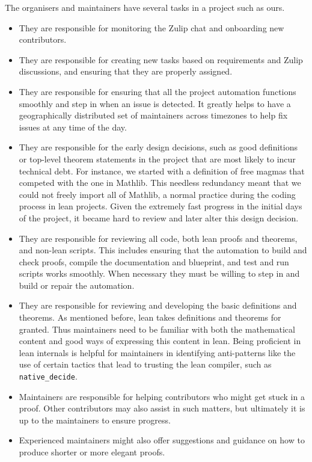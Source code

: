 The organisers and maintainers have several tasks in a project such as ours.
\begin{itemize}
    \item They are responsible for monitoring the Zulip chat and onboarding new contributors.
    \item They are responsible for creating new tasks based on requirements and Zulip discussions, and ensuring that they are properly assigned.
    \item They are responsible for ensuring that all the project automation functions smoothly and step in when an issue is detected. It greatly helps to have a geographically distributed set of maintainers across timezones to help fix issues at any time of the day.
    \item They are responsible for the early design decisions, such as good definitions or top-level theorem statements in the project that are most likely to incur technical debt. For instance, we started with a definition of free magmas that competed with the one in Mathlib. This needless redundancy meant that we could not freely import all of Mathlib, a normal practice during the coding process in lean projects. Given the extremely fast progress in the initial days of the project, it became hard to review and later alter this design decision.
    \item They are responsible for reviewing all code, both lean proofs and theorems, and non-lean scripts. This includes ensuring that the automation to build and check proofs, compile the documentation and blueprint, and test and run scripts works smoothly. When necessary they must be willing to step in and build or repair the automation.
    \item They are responsible for reviewing and developing the basic definitions and theorems. As mentioned before, lean takes definitions and theorems for granted. Thus maintainers need to be familiar with both the mathematical content and good ways of expressing this content in lean. Being proficient in lean internals is helpful for maintainers in identifying anti-patterns like the use of certain tactics that lead to trusting the lean compiler, such as \texttt{native\_decide}.
    \item Maintainers are responsible for helping contributors who might get stuck in a proof. Other contributors may also assist in such matters, but ultimately it is up to the maintainers to ensure progress.
    \item Experienced maintainers might also offer suggestions and guidance on how to produce shorter or more elegant proofs.

\end{itemize}
